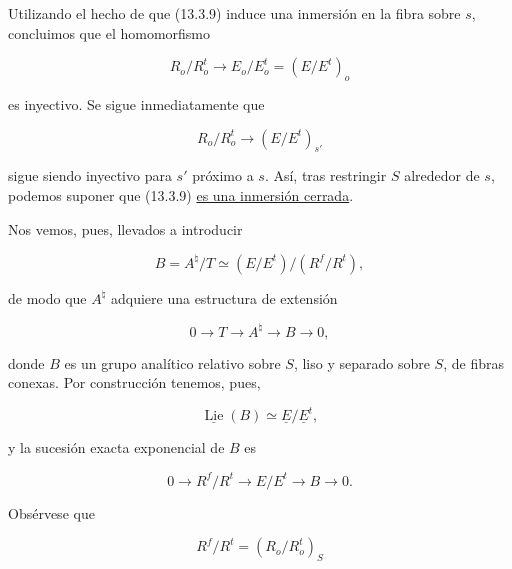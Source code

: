 \noindent
Utilizando el hecho de que (13.3.9) induce una inmersión en la fibra
sobre $s$, concluimos que el homomorfismo

\begin{equation*}
 R_o/R_o^t\longrightarrow E_o/E_o^t=(E/E^t)_o
\end{equation*}

\noindent
es inyectivo. Se sigue inmediatamente que

\begin{equation*}
 R_o/R_o^t\longrightarrow(E/E^t)_{s'}
\end{equation*}

\noindent
sigue siendo inyectivo para $s'$ próximo a $s$. Así, tras restringir $S$
alrededor de $s$, podemos suponer que (13.3.9) \underline{es una
inmersión cerrada}.


Nos vemos, pues, llevados a introducir

\begin{equation}\tag{13.3.12}
 B=A^\natural/T\simeq(E/E^t)/(R^f/R^t),
\end{equation}

\noindent
de modo que $A^\natural$ adquiere una estructura de extensión

\begin{equation}\tag{13.3.13}
 0\longrightarrow T\longrightarrow A^\natural
 \longrightarrow B\longrightarrow0,
\end{equation}

\noindent
donde $B$ es un grupo analítico relativo sobre $S$, liso y separado
sobre $S$, de fibras conexas. Por construcción tenemos, pues,

\begin{equation}\tag{13.3.14}
 \underline{\operatorname{Lie}}(B)\simeq
 \underline E/\underline E^t,
\end{equation}

\noindent
y la sucesión exacta exponencial de $B$ es

\begin{equation}\tag{13.3.15}
 0\longrightarrow R^f/R^t\longrightarrow E/E^t
 \longrightarrow B\longrightarrow0.
\end{equation}

\noindent
Obsérvese que

\begin{equation}\tag{13.3.16}
 R^f/R^t=(R_o/R_o^t)_S
\end{equation}

